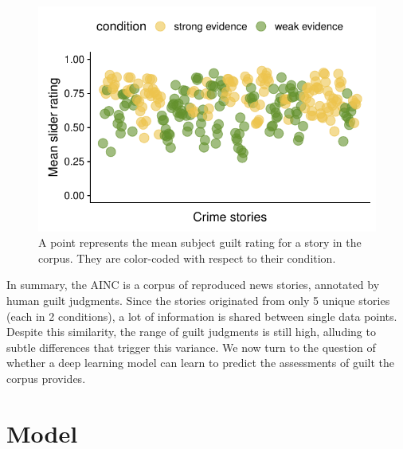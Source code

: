 \documentclass[11pt,a4paper]{article}
\begin{document}
\begin{figure}[t!]
	\includegraphics[width=\linewidth]{graphs/subjguilt.pdf}
	\caption{A point represents the mean subject guilt rating for a story in the corpus. They are color-coded with respect to their condition.}
	\label{fig:corpus-annotations}
\end{figure}

In summary, the AINC is a corpus of reproduced news stories, annotated by human guilt judgments. Since the stories originated from only 5 unique stories (each in 2 conditions), a lot of information is shared between single data points.  Despite this similarity, the range of guilt judgments is still high, alluding to subtle differences that trigger this variance. We now turn to the question of whether a deep learning model can learn to predict the assessments of guilt the corpus provides.



\section{Model}
\end{document}
